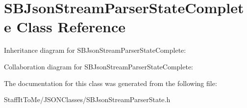 \hypertarget{interface_s_b_json_stream_parser_state_complete}{
\section{\-S\-B\-Json\-Stream\-Parser\-State\-Complete \-Class \-Reference}
\label{interface_s_b_json_stream_parser_state_complete}
}


\-Inheritance diagram for \-S\-B\-Json\-Stream\-Parser\-State\-Complete\-:


\-Collaboration diagram for \-S\-B\-Json\-Stream\-Parser\-State\-Complete\-:


\-The documentation for this class was generated from the following file\-:\begin{DoxyCompactItemize}
\item 
\-Staff\-It\-To\-Me/\-J\-S\-O\-N\-Classes/\-S\-B\-Json\-Stream\-Parser\-State.\-h\end{DoxyCompactItemize}
